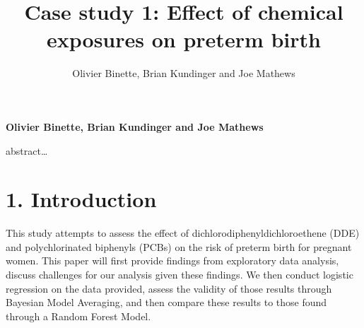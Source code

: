 \documentclass[10pt,]{article}
\title{Case study 1: Effect of chemical exposures on preterm birth  }
\author{\Large Olivier Binette, Brian Kundinger and Joe
Mathews\vspace{0.05in} \newline\normalsize\emph{}  }
\date{}
\newcommand*{\authorfont}{\fontfamily{phv}\selectfont}
\renewenvironment{abstract}
 {{%
    \setlength{\leftmargin}{0mm}
    \setlength{\rightmargin}{\leftmargin}%
  }%
  \relax}
 {\endlist}
\begin{document}
	
%    


{%
\setlength{\parindent}{0pt}
\thispagestyle{plain}
{\fontsize{18}{20}\selectfont\raggedright 
\maketitle  %

}

{
   \vskip 13.5pt\relax \normalsize\fontsize{11}{12} 
\textbf{\authorfont Olivier Binette, Brian Kundinger and Joe
Mathews} \hskip 15pt \emph{\small }   

}

}








\begin{abstract}

    \hbox{\vrule height .2pt width 39.14pc}

    \vskip 8.5pt %

\noindent abstract\ldots{}


    \hbox{\vrule height .2pt width 39.14pc}


\end{abstract}


\vskip -8.5pt



\noindent  

\hypertarget{introduction}{%
\section{1. Introduction}\label{introduction}}

This study attempts to assess the effect of
dichlorodiphenyldichloroethene (DDE) and polychlorinated biphenyls
(PCBs) on the risk of preterm birth for pregnant women. This paper will
first provide findings from exploratory data analysis, discuss
challenges for our analysis given these findings. We then conduct
logistic regression on the data provided, assess the validity of those
results through Bayesian Model Averaging, and then compare these results
to those found through a Random Forest Model.
\end{document}
